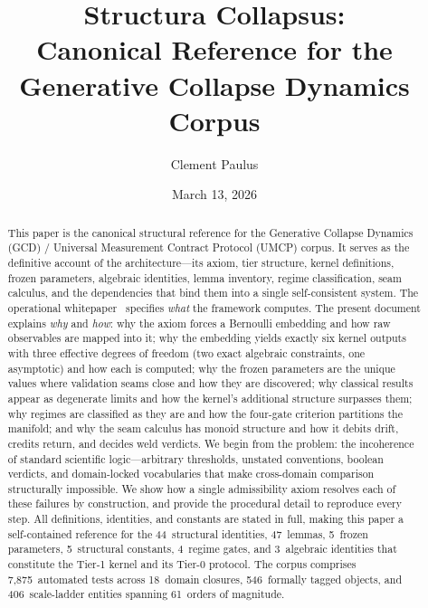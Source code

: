 \documentclass[
  aps,
  prd,
  twocolumn,
  superscriptaddress,
  nofootinbib,
  floatfix
]{revtex4-2}
\begin{document}
\title{Structura Collapsus:
\texorpdfstring{\\}{: }Canonical Reference for the
Generative Collapse Dynamics Corpus}

\author{Clement Paulus}

\date{March 13, 2026}

\begin{abstract}
This paper is the canonical structural reference for the
Generative Collapse Dynamics (GCD) / Universal Measurement
Contract Protocol (UMCP) corpus.  It serves as the definitive
account of the architecture---its axiom, tier structure, kernel
definitions, frozen parameters, algebraic identities, lemma
inventory, regime classification, seam calculus, and the
dependencies that bind them into a single self-consistent system.
The operational whitepaper~\cite{umcpmetadatarepo} specifies
\emph{what} the framework computes.  The present document
explains \emph{why} and \emph{how}: why the axiom forces a
Bernoulli embedding and how raw observables are mapped into it;
why the embedding yields exactly six kernel outputs with three
effective degrees of freedom (two exact algebraic constraints,
one asymptotic) and how each is computed; why the
frozen parameters are the unique values where validation seams
close and how they are discovered; why classical results appear
as degenerate limits and how the kernel's additional structure
surpasses them; why regimes are classified as they are and how
the four-gate criterion partitions the manifold; and why the
seam calculus has monoid structure and how it debits drift,
credits return, and decides weld verdicts.  We begin from the
problem: the incoherence of standard scientific logic---arbitrary
thresholds, unstated conventions, boolean verdicts, and
domain-locked vocabularies that make cross-domain comparison
structurally impossible.  We show how a single admissibility
axiom resolves each of these failures by construction, and
provide the procedural detail to reproduce every step.  All
definitions, identities, and constants are stated in full,
making this paper a self-contained reference for the
44~structural identities, 47~lemmas, 5~frozen parameters,
5~structural constants, 4~regime gates, and 3~algebraic
identities that constitute the Tier-1 kernel and its Tier-0
protocol.  The corpus comprises 7{,}875~automated tests across
18~domain closures, 546~formally tagged objects, and
406~scale-ladder entities spanning 61~orders of magnitude.
\end{abstract}
\end{document}
